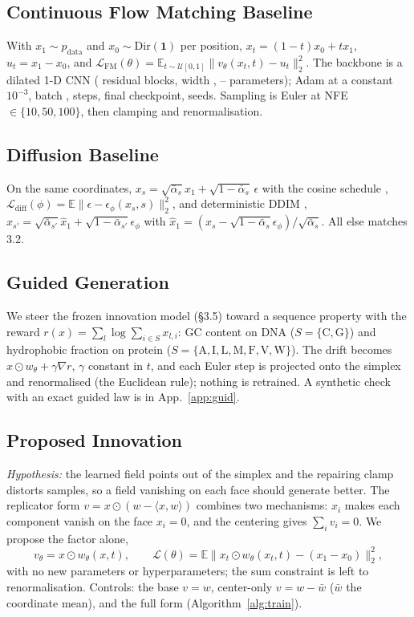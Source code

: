 \documentclass{article}
\begin{document}
\subsection{Continuous Flow Matching Baseline}
With $x_1\sim p_{\text{data}}$ and $x_0\sim\mathrm{Dir}(\mathbf 1)$ per position,
$x_t=(1-t)x_0+tx_1$, $u_t=x_1-x_0$, and
$\mathcal L_{\text{FM}}(\theta)=\mathbb E_{t\sim\mathcal U[0,1]}\lVert v_\theta(x_t,t)-u_t\rVert_2^2$.
The backbone is a dilated 1-D CNN (\MOneLayers{} residual blocks, width \MOneWidth,
\MOneParamsLo--\MOneParamsHi{} parameters); Adam at a constant $10^{-3}$, batch \MOneBatch,
\MOneSteps{} steps, final checkpoint, \MOneSeeds{} seeds. Sampling is Euler at NFE
$\in\{10,50,100\}$, then clamping and renormalisation.

\subsection{Diffusion Baseline}
On the same coordinates, $x_s=\sqrt{\bar\alpha_s}x_1+\sqrt{1-\bar\alpha_s}\,\epsilon$ with the cosine
schedule \citep{nichol2021improved},
$\mathcal L_{\text{diff}}(\phi)=\mathbb E\lVert\epsilon-\epsilon_\phi(x_s,s)\rVert_2^2$, and
deterministic DDIM \citep{song2021ddim},
$x_{s'}=\sqrt{\bar\alpha_{s'}}\hat x_1+\sqrt{1-\bar\alpha_{s'}}\epsilon_\phi$ with
$\hat x_1=(x_s-\sqrt{1-\bar\alpha_s}\epsilon_\phi)/\sqrt{\bar\alpha_s}$. All else matches 3.2.

\subsection{Guided Generation}
We steer the frozen innovation model (\S3.5) toward a sequence property with the reward
$r(x)=\sum_l\log\sum_{i\in S}x_{l,i}$: GC content on DNA ($S=\{\mathrm{C},\mathrm{G}\}$) and
hydrophobic fraction on protein ($S=\{\mathrm{A,I,L,M,F,V,W}\}$). The drift becomes
$x\odot w_\theta+\gamma\nabla r$, $\gamma$ constant in $t$, and each Euler step is projected onto the
simplex and renormalised (the Euclidean rule); nothing is retrained. A synthetic check with an
exact guided law is in App.~\ref{app:guid}.

\subsection{Proposed Innovation}
\emph{Hypothesis:} the learned field points out of the simplex and the repairing clamp distorts
samples, so a field vanishing on each face should generate better. The replicator form
$v=x\odot(w-\langle x,w\rangle)$ \citep{boll2024assignment} combines two mechanisms: $x_i$ makes each
component vanish on the face $x_i=0$, and the centering gives $\sum_iv_i=0$. We propose the factor
alone,
\begin{equation}
v_\theta=x\odot w_\theta(x,t),\qquad
\mathcal L(\theta)=\mathbb E\lVert x_t\odot w_\theta(x_t,t)-(x_1-x_0)\rVert_2^2,
\end{equation}
with no new parameters or hyperparameters; the sum constraint is left to renormalisation. Controls:
the base $v=w$, center-only $v=w-\bar w$ ($\bar w$ the coordinate mean), and the full form (Algorithm~\ref{alg:train}).
\end{document}
